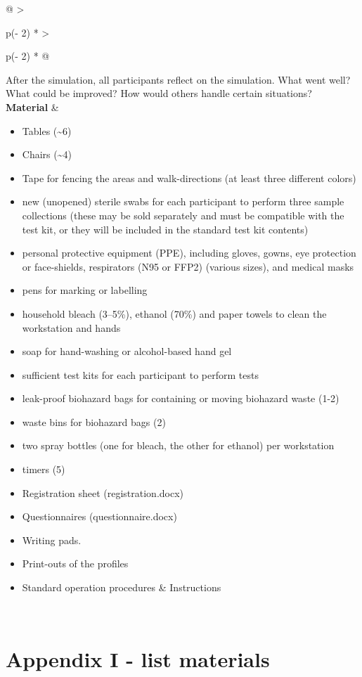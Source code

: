 \documentclass[
]{book}
\begin{document}
\begin{longtable}[]{@{}
  >{\raggedright\arraybackslash}p{(\columnwidth - 2\tabcolsep) * }
  >{\raggedright\arraybackslash}p{(\columnwidth - 2\tabcolsep) * }@{}}
After the simulation, all participants reflect on the
simulation. What went well? What could be improved?
How would others handle certain situations? \\
\textbf{Material} & \begin{minipage}[t]{\linewidth}\raggedright
\begin{itemize}
\item
  Tables (\textasciitilde6)
\item
  Chairs (\textasciitilde4)
\item
  Tape for fencing the areas and walk-directions
  (at least three different colors)
\item
  new (unopened) sterile swabs for each participant
  to perform three sample collections (these may be
  sold separately and must be compatible with the
  test kit, or they will be included in the
  standard test kit contents)
\item
  personal protective equipment (PPE), including
  gloves, gowns, eye protection or face-shields,
  respirators (N95 or FFP2) (various sizes), and
  medical masks
\item
  pens for marking or labelling
\item
  household bleach (3--5\%), ethanol (70\%) and paper
  towels to clean the workstation and hands
\item
  soap for hand-washing or alcohol-based hand gel
\item
  sufficient test kits for each participant to
  perform tests
\item
  leak-proof biohazard bags for containing or
  moving biohazard waste (1-2)
\item
  waste bins for biohazard bags (2)
\item
  two spray bottles (one for bleach, the other for
  ethanol) per workstation
\item
  timers (5)
\item
  Registration sheet (registration.docx)
\item
  Questionnaires (questionnaire.docx)
\item
  Writing pads.
\item
  Print-outs of the profiles
\item
  Standard operation procedures \& Instructions
\end{itemize}
\end{minipage} \\
\bottomrule
\end{longtable}

\hypertarget{appendix-i---list-materials}{%
\section{Appendix I - list materials}\label{appendix-i---list-materials}}
\end{document}
